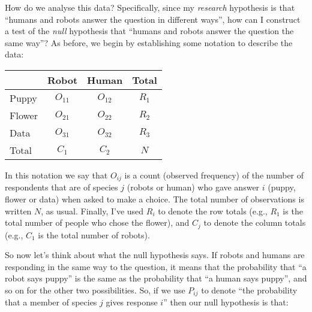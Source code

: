 
How do we analyse this data? Specifically, since my {\it research} hypothesis is that ``humans and robots answer the question in different ways'', how can I construct a test of the {\it null} hypothesis that ``humans and robots answer the question the same way''? As before, we begin by establishing some notation to describe the data:
\begin{center}
\begin{tabular}{l|cc|c}
          & Robot & Human & Total \\ \hline
Puppy     & $O_{11}$  & $O_{12}$ & $R_{1}$ \\
Flower    & $O_{21}$ & $O_{22}$ & $R_{2}$ \\
Data      & $O_{31}$  & $O_{32}$ & $R_{3}$ \\ \hline
Total     & $C_{1}$ & $C_{2}$ & $N$
\end{tabular}
\end{center}

\noindent
In this notation we say that $O_{ij}$ is a count (observed frequency) of the number of respondents that are of species $j$ (robots or human) who gave answer $i$ (puppy, flower or data) when asked to make a choice. The total number of observations is written $N$, as usual. Finally, I've used $R_i$ to denote the row totals (e.g., $R_1$ is the total number of people who chose the flower), and $C_j$ to denote the column totals (e.g., $C_1$ is the total number of robots).

So now let's think about what the null hypothesis says. If robots and humans are responding in the same way to the question, it means that the probability that ``a robot says puppy'' is the same as the probability that ``a human says puppy'', and so on for the other two possibilities. So, if we use $P_{ij}$ to denote ``the probability that a member of species $j$ gives response $i$'' then our null hypothesis is that:

